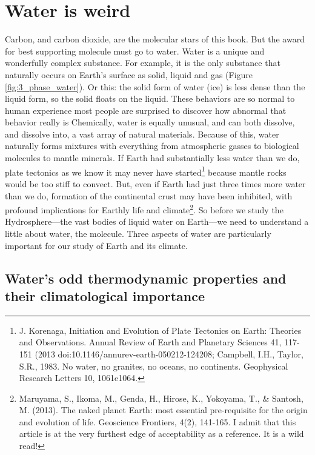 \section{Water is weird}
Carbon, and carbon dioxide, are the molecular stars of this book. But the award for best supporting molecule must go to water. Water is a unique and wonderfully complex substance. For example, it is the only substance that naturally occurs on Earth's surface as solid, liquid and gas (Figure \ref{fig:3_phase_water}). Or this: the solid form of water (ice) is less dense than the liquid form, so the solid floats on the liquid. These behaviors are so normal to human experience most people are surprised to discover how abnormal that behavior really is Chemically, water is equally unusual, and can both dissolve, and dissolve into, a vast array of natural materials. Because of this, water naturally forms mixtures with everything from atmospheric gasses to biological molecules to mantle minerals. If Earth had substantially less water than we do, plate tectonics as we know it may never have started\footnote{J. Korenaga, Initiation and Evolution of Plate Tectonics on Earth: Theories and Observations. Annual Review of Earth and Planetary Sciences 41, 117-151 (2013 doi:10.1146/annurev-earth-050212-124208; Campbell, I.H., Taylor, S.R., 1983. No water, no granites, no oceans, no continents. Geophysical Research Letters 10, 1061e1064.} because mantle rocks would be too stiff to convect. But, even if Earth had just three times more water than we do, formation of the continental crust may have been inhibited, with profound implications for Earthly life and climate\footnote{Maruyama, S., Ikoma, M., Genda, H., Hirose, K., Yokoyama, T., \& Santosh, M. (2013). The naked planet Earth: most essential pre-requisite for the origin and evolution of life. Geoscience Frontiers, 4(2), 141-165. I admit that this article is at the very furthest edge of acceptability as a reference. It is a wild read!}. So before we study the Hydrosphere---the vast bodies of liquid water on Earth---we need to understand a little about water, the molecule. Three aspects of water are particularly important for our study of Earth and its climate. 
\subsection{Water's odd thermodynamic properties and their climatological importance}
